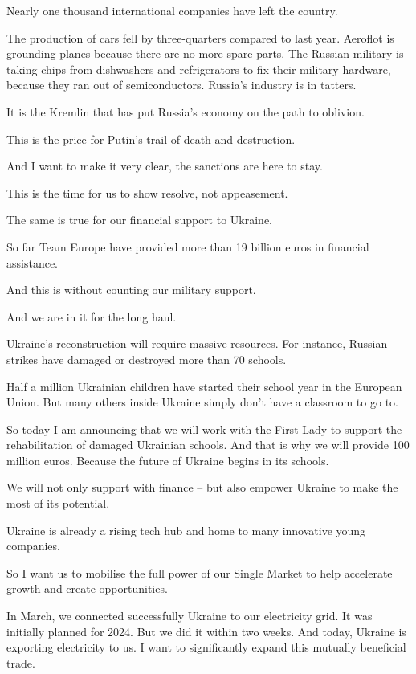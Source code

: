 \documentclass[a4paper,11pt]{article}
\begin{document}
Nearly one thousand international companies have left the country.

The production of cars fell by three-quarters compared to last year. Aeroflot is grounding planes because there are no more spare parts. The Russian military is taking chips from dishwashers and refrigerators to fix their military hardware, because they ran out of semiconductors. Russia's industry is in tatters.

It is the Kremlin that has put Russia's economy on the path to oblivion.

This is the price for Putin's trail of death and destruction.

And I want to make it very clear, the sanctions are here to stay.

This is the time for us to show resolve, not appeasement.

The same is true for our financial support to Ukraine.

So far Team Europe have provided more than 19 billion euros in financial assistance.

And this is without counting our military support.

And we are in it for the long haul.

Ukraine's reconstruction will require massive resources. For instance, Russian strikes have damaged or destroyed more than 70 schools.

Half a million Ukrainian children have started their school year in the European Union. But many others inside Ukraine simply don't have a classroom to go to.

So today I am announcing that we will work with the First Lady to support the rehabilitation of damaged Ukrainian schools. And that is why we will provide 100 million euros. Because the future of Ukraine begins in its schools.

We will not only support with finance – but also empower Ukraine to make the most of its potential.

Ukraine is already a rising tech hub and home to many innovative young companies.

So I want us to mobilise the full power of our Single Market to help accelerate growth and create opportunities.

In March, we connected successfully Ukraine to our electricity grid. It was initially planned for 2024. But we did it within two weeks. And today, Ukraine is exporting electricity to us. I want to significantly expand this mutually beneficial trade.
\end{document}
